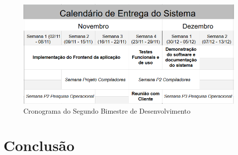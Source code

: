 \documentclass[12pt,a4paper]{report}
\begin{document}
\begin{figure}[!h]
\centering
\includegraphics[width = \linewidth]{imagens/Calendario2bi.png}
\caption{Cronograma do Segundo Bimestre de Desenvolvimento}
\label{Cronograma do Segundo Bimestre de Desenvolvimento}
\end{figure}

\chapter{Conclusão}
\end{document}
